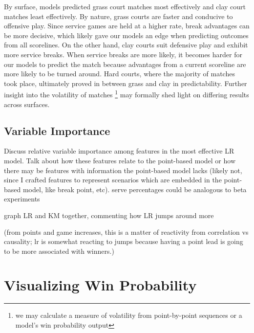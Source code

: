 \documentclass[chapterprefix=false]{report}
\begin{document}
By surface, models predicted grass court matches most effectively and clay court matches least effectively. By nature, grass courts are faster and conducive to offensive play. Since service games are held at a higher rate, break advantages can be more decisive, which likely gave our models an edge when predicting outcomes from all scorelines. On the other hand, clay courts suit defensive play and exhibit more service breaks. When service breaks are more likely, it becomes harder for our models to predict the match because advantages from a current scoreline are more likely to be turned around. Hard courts, where the majority of matches took place, ultimately proved in between grass and clay in predictability. Further insight into the volatility of matches \footnote{we may calculate a measure of volatility from point-by-point sequences or a model's win probability output} may formally shed light on differing results across surfaces.




\subsection{Variable Importance}

Discuss relative variable importance among features in the most effective LR model. Talk about how these features relate to the point-based model or how there may be features with information the point-based model lacks (likely not, since I crafted features to represent scenarios which are embedded in the point-based model, like break point, etc). serve percentages could be analogous to beta experiments

graph LR and KM together, commenting how LR jumps around more

(from points and game increases, this is a matter of reactivity from correlation vs causality; lr is somewhat reacting to jumps because having a point lead is going to be more associated with winners.)

\section{Visualizing Win Probability}
\end{document}
